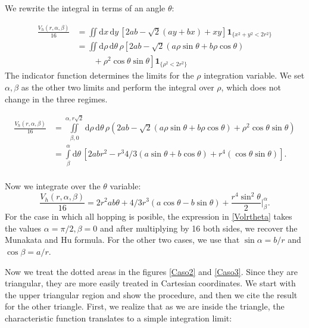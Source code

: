\documentclass[superscriptaddress,pre,reprint,showpacs,twocolumn]{revtex4-1}
\newcommand{\rd}[1]{\mathrm{d}{#1} \,}
\newcommand{\indicatorsymbol}{\mathbf{1}}
\newcommand{\indicator}[1]{\indicatorsymbol_{ \{   #1 \} } }
\begin{document}
We rewrite the integral in terms of an angle $\theta$:

\begin{equation}\label{app:volcyl}
\begin{split}
\frac{V_h(r,\alpha,\beta)}{16} &=
\iint \rd x \rd y \left[ 2ab-\sqrt{2}(ay+bx)+x y \right]
\indicator{x^2 + y^2 < 2r^2}\\
&=
\iint \rd \rho \rd \theta \rho 
\left[ 2ab -\sqrt{2}(a\rho\sin\theta+b\rho\cos\theta) \right. \\
& \qquad + \left. \rho^2 \cos\theta\sin\theta \right]
\indicator{\rho^2<2r^2 }
\end{split}
\end{equation}
The indicator function determines the limits for the $\rho$ integration variable.
We set $\alpha, \beta$ as the other two limits and perform the
integral over $\rho$,  which does not change in the three regimes.
\begin{widetext}
\begin{equation}
  \begin{split}
    \frac{V_h(r,\alpha,\beta)}{16} &=
    \iint\limits_{\beta,0}^{\alpha,r\sqrt{2}} \rd \rho \rd \theta \rho
    \left( 2ab -\sqrt{2}(a\rho\sin\theta+b\rho\cos\theta) 
    +\rho^2 \cos\theta\sin\theta \right)\\
 &=\int\limits_\beta^{\alpha}  \rd \theta  
\left[ 2abr^2 - r^3 4/3 (a\sin\theta+b\cos\theta)+r^4 (\cos\theta\sin\theta) \right].\\
\end{split}
\end{equation}
\end{widetext}
Now we integrate over the $\theta$ variable:
\begin{equation}\label{Volrtheta}
  \frac{V_h(r,\alpha,\beta)}{16} = 2r^2ab\theta
  +4/3r^3(a\cos\theta-b\sin\theta)
  +\frac{r^4 \sin^2\theta}{2} \Bigg\vert_\beta^\alpha.
\end{equation}
For the case in which all hopping is posible, the expression in \eqref{Volrtheta}
takes the values $\alpha=\pi/2, \beta=0$ and after multiplying by 16 both sides,
we recover the Munakata and Hu formula. For the other two cases, we use that
$\sin \alpha = b / r$ and $\cos \beta = a / r$.




Now we treat the dotted areas in the figures \ref{Caso2} and \ref{Caso3}. Since they are triangular, they
are more easily treated in Cartesian coordinates. We start with the upper
triangular region
and show the procedure, and then we cite the result for the
other triangle.
First, we realize that as we are inside the triangle, the characteristic function
translates to a simple integration limit:
\end{document}
